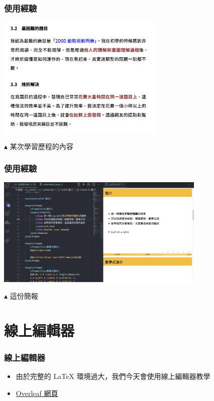 \documentclass[mathserif]{beamer}
\begin{document}
\begin{frame}
    \frametitle{使用經驗}
    \begin{center}
        \includegraphics[width=8.0cm]{img/example2.png}
        
        $\blacktriangle$ 某次學習歷程的內容
    \end{center}
\end{frame}

\begin{frame}
    \frametitle{使用經驗}
    \begin{center}
        \includegraphics[width=10.0cm]{img/example3.png}
        
        $\blacktriangle$ 這份簡報
    \end{center}
\end{frame}

\section{線上編輯器}

\begin{frame}
    \frametitle{線上編輯器}
    \begin{itemize}
        \item 由於完整的 LaTeX 環境過大，我們今天會使用線上編輯器教學
        \item \href{https://www.overleaf.com}{Overleaf 網頁}
    \end{itemize}
\end{frame}
\end{document}
